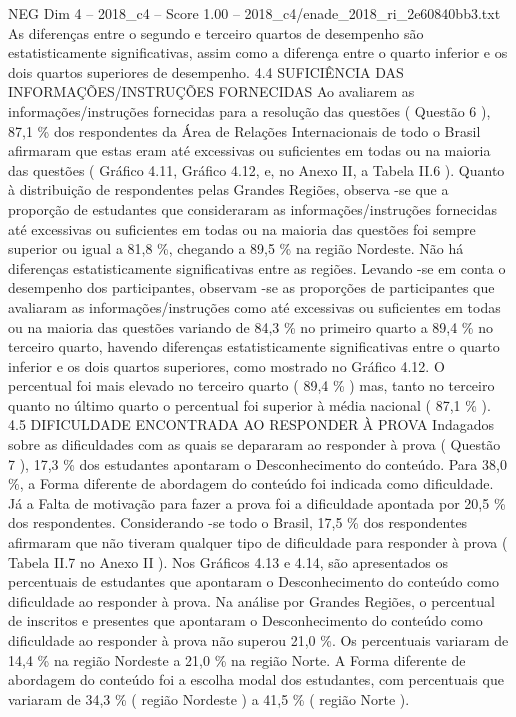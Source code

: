 \begin{textsample}{NEG Dim 4 – 2018\_c4 – Score 1.00 – 2018\_c4/enade\_2018\_ri\_2e60840bb3.txt}
As diferenças entre o segundo e terceiro quartos de desempenho são estatisticamente significativas, assim como a diferença entre o quarto inferior e os dois quartos superiores de desempenho. 4.4 SUFICIÊNCIA DAS INFORMAÇÕES/INSTRUÇÕES FORNECIDAS Ao avaliarem as informações/instruções fornecidas para a resolução das questões ( Questão 6 ), 87,1 \% dos respondentes da Área de Relações Internacionais de todo o Brasil afirmaram que estas eram até excessivas ou suficientes em todas ou na maioria das questões ( Gráfico 4.11, Gráfico 4.12, e, no Anexo II, a Tabela II.6 ).
Quanto à distribuição de respondentes pelas Grandes Regiões, observa -se que a proporção de estudantes que consideraram as informações/instruções fornecidas até excessivas ou suficientes em todas ou na maioria das questões foi sempre superior ou igual a 81,8 \%, chegando a 89,5 \% na região Nordeste.
Não há diferenças estatisticamente significativas entre as regiões.
Levando -se em conta o desempenho dos participantes, observam -se as proporções de participantes que avaliaram as informações/instruções como até excessivas ou suficientes em todas ou na maioria das questões variando de 84,3 \% no primeiro quarto a 89,4 \% no terceiro quarto, havendo diferenças estatisticamente significativas entre o quarto inferior e os dois quartos superiores, como mostrado no Gráfico 4.12.
O percentual foi mais elevado no terceiro quarto ( 89,4 \% ) mas, tanto no terceiro quanto no último quarto o percentual foi superior à média nacional ( 87,1 \% ). 4.5 DIFICULDADE ENCONTRADA AO RESPONDER À PROVA Indagados sobre as dificuldades com as quais se depararam ao responder à prova ( Questão 7 ), 17,3 \% dos estudantes apontaram o Desconhecimento do conteúdo.
Para 38,0 \%, a Forma diferente de abordagem do conteúdo foi indicada como dificuldade.
Já a Falta de motivação para fazer a prova foi a dificuldade apontada por 20,5 \% dos respondentes.
Considerando -se todo o Brasil, 17,5 \% dos respondentes afirmaram que não tiveram qualquer tipo de dificuldade para responder à prova ( Tabela II.7 no Anexo II ).
Nos Gráficos 4.13 e 4.14, são apresentados os percentuais de estudantes que apontaram o Desconhecimento do conteúdo como dificuldade ao responder à prova.
Na análise por Grandes Regiões, o percentual de inscritos e presentes que apontaram o Desconhecimento do conteúdo como dificuldade ao responder à prova não superou 21,0 \%.
Os percentuais variaram de 14,4 \% na região Nordeste a 21,0 \% na região Norte.
A Forma diferente de abordagem do conteúdo foi a escolha modal dos estudantes, com percentuais que variaram de 34,3 \% ( região Nordeste ) a 41,5 \% ( região Norte ).

\end{textsample}
